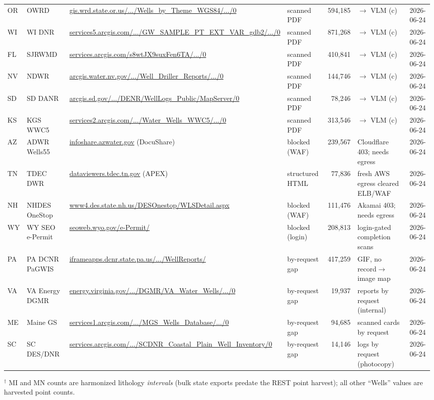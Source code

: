 \documentclass[12pt]{article}
\begin{document}
\begin{longtable}{L{0.05\textwidth} L{0.16\textwidth} L{0.26\textwidth} L{0.10\textwidth} r L{0.10\textwidth} c}
OR & OWRD \citep{data_or_owrd} & \url{gis.wrd.state.or.us/.../Wells_by_Theme_WGS84/.../0} & scanned PDF & 594{,}185 &  $\to$ VLM (c) & 2026-06-24 \\
WI & WI DNR \citep{data_wi_dnr} & \url{services5.arcgis.com/.../GW_SAMPLE_PT_EXT_VAR_gdb2/.../0} & scanned PDF & 871{,}268 &  $\to$ VLM (c) & 2026-06-24 \\
FL & SJRWMD \citep{data_fl_sjrwmd} & \url{services.arcgis.com/s8wtJX9suxFen6TA/.../0} & scanned PDF & 410{,}841 &  $\to$ VLM (c) & 2026-06-24 \\
NV & NDWR \citep{data_nv_ndwr} & \url{arcgis.water.nv.gov/.../Well_Driller_Reports/.../0} & scanned PDF & 144{,}746 &  $\to$ VLM (c) & 2026-06-24 \\
SD & SD DANR \citep{data_sd_danr} & \url{arcgis.sd.gov/.../DENR/WellLogs_Public/MapServer/0} & scanned PDF & 78{,}246 &  $\to$ VLM (c) & 2026-06-24 \\
KS & KGS WWC5 \citep{data_ks_kgs} & \url{services2.arcgis.com/.../Water_Wells_WWC5/.../0} & scanned PDF & 313{,}546 &  $\to$ VLM (c) & 2026-06-24 \\
AZ & ADWR Wells55 \citep{data_az_adwr} & \url{infoshare.azwater.gov} (DocuShare) & blocked (WAF) & 239{,}567 & Cloudflare 403; needs egress & 2026-06-24 \\
TN & TDEC DWR \citep{data_tn_tdec} & \url{dataviewers.tdec.tn.gov} (APEX) & structured HTML & 77{,}836 & fresh AWS egress cleared ELB/WAF & 2026-06-24 \\
NH & NHDES OneStop \citep{data_nh_des} & \url{www4.des.state.nh.us/DESOnestop/WLSDetail.aspx} & blocked (WAF) & 111{,}476 & Akamai 403; needs egress & 2026-06-24 \\
WY & WY SEO e-Permit \citep{data_wy_seo} & \url{seoweb.wyo.gov/e-Permit/} & blocked (login) & 208{,}813 & login-gated completion scans & 2026-06-24 \\
PA & PA DCNR PaGWIS \citep{data_pa_dcnr} & \url{iframeapps.dcnr.state.pa.us/.../WellReports/} & by-request gap & 417{,}259 & GIF, no record$\to$image map & 2026-06-24 \\
VA & VA Energy DGMR \citep{data_va_dgmr} & \url{energy.virginia.gov/.../DGMR/VA_Water_Wells/.../0} & by-request gap & 19{,}937 & reports by request (internal) & 2026-06-24 \\
ME & Maine GS \citep{data_me_mgs} & \url{services1.arcgis.com/.../MGS_Wells_Database/.../0} & by-request gap & 94{,}685 & scanned cards by request & 2026-06-24 \\
SC & SC DES/DNR \citep{data_sc_des} & \url{services.arcgis.com/.../SCDNR_Coastal_Plain_Well_Inventory/0} & by-request gap & 14{,}146 & logs by request (photocopy) & 2026-06-24 \\
\end{longtable}
\normalsize
\noindent$^\dagger$ MI and MN counts are harmonized lithology \emph{intervals} (bulk state exports
predate the REST point harvest); all other ``Wells'' values are harvested point counts.



\end{document}
